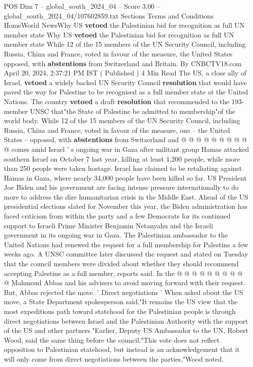 \begin{textsample}{POS Dim 7 – global\_south\_2024\_04 – Score 3.00 – global\_south\_2024\_04/107602859.txt}  \label{ex:f7_pos_106}
Sections Terms and Conditions HomeWorld NewsWhy US \textbf{vetoed} the Palestinian bid for recognition as full UN member state Why US \textbf{vetoed} the Palestinian bid for recognition as full UN member state While 12 of the 15 members of the UN Security Council, including Russia, China and France, voted in favour of the measure, the United States opposed, with \textbf{abstentions} from Switzerland and Britain.
By CNBCTV18.com April 20, 2024, 2:37:21 PM IST ( Published ) 4 Min Read The US, a close ally of Israel, \textbf{vetoed} a widely backed UN Security Council \textbf{resolution} that would have paved the way for Palestine to be recognised as a full member state at the United Nations.
The country \textbf{vetoed} a draft \textbf{resolution} that recommended to the 193-member UNSC that"the State of Palestine be admitted to membership"of the world body.
While 12 of the 15 members of the UN Security Council, including Russia, China and France, voted in favour of the measure, one -- the United States -- opposed, with \textbf{abstentions} from Switzerland and @ @ @ @ @ @ @ @ @ @ comes amid Israel ' s ongoing war in Gaza after militant group Hamas attacked southern Israel on October 7 last year, killing at least 1,200 people, while more than 250 people were taken hostage.
Israel has claimed to be retaliating against Hamas in Gaza, where nearly 34,000 people have been killed so far.
US President Joe Biden and his government are facing intense pressure internationally to do more to address the dire humanitarian crisis in the Middle East.
Ahead of the US presidential elections slated for November this year, the Biden administration has faced criticism from within the party and a few Democrats for its continued support to Israeli Prime Minister Benjamin Netanyahu and the Israeli government in its ongoing war in Gaza.
The Palestinian ambassador to the United Nations had renewed the request for a full membership for Palestine a few weeks ago.
A UNSC committee later discussed the request and stated on Tuesday that the council members were divided about whether they should recommend accepting Palestine as a full member, reports said.
In the @ @ @ @ @ @ @ @ @ @ Mahmoud Abbas and his advisers to avoid moving forward with their request.
But, Abbas rejected the move. ' Direct negotiations ' When asked about the US move, a State Department spokesperson said,"It remains the US view that the most expeditious path toward statehood for the Palestinian people is through direct negotiations between Israel and the Palestinian Authority with the support of the US and other partners."Earlier, Deputy US Ambassador to the UN, Robert Wood, said the same thing before the council."This vote does not reflect opposition to Palestinian statehood, but instead is an acknowledgement that it will only come from direct negotiations between the parties,"Wood noted.

\end{textsample}
